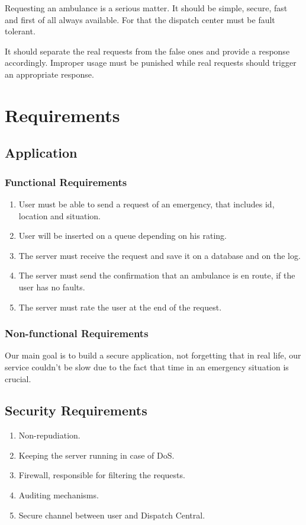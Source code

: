 \documentclass[a4paper,titlepage,11pt]{article}
\begin{document}
Requesting an ambulance is a serious matter.
It should be simple, secure, fast and first of all always available.
For that the dispatch center must be fault tolerant.

It should separate the real requests from the false ones and provide a response accordingly.
Improper usage must be punished while real requests should trigger an appropriate response.

\section{Requirements}

\subsection{Application}
\subsubsection{Functional Requirements}

\begin{enumerate}
  \item User must be able to send a request of an emergency, that includes id, location and situation.
  \item User will be inserted on a queue depending on his rating.
  \item The server must receive the request and save it on a database and on the log.
  \item The server must send the confirmation that an ambulance is en route, if the user has no faults.
  \item The server must rate the user at the end of the request.
\end{enumerate}

\subsubsection{Non-functional Requirements}
Our main goal is to build a secure application, not forgetting that in real life,
our service couldn't be slow due to the fact that time in an emergency situation is crucial.

\subsection{Security Requirements}
\begin{enumerate}
  \item Non-repudiation.
  \item Keeping the server running in case of DoS.
  \item Firewall, responsible for filtering the requests.
  \item Auditing mechanisms.
  \item Secure channel between user and Dispatch Central.
\end{enumerate}
\end{document}
